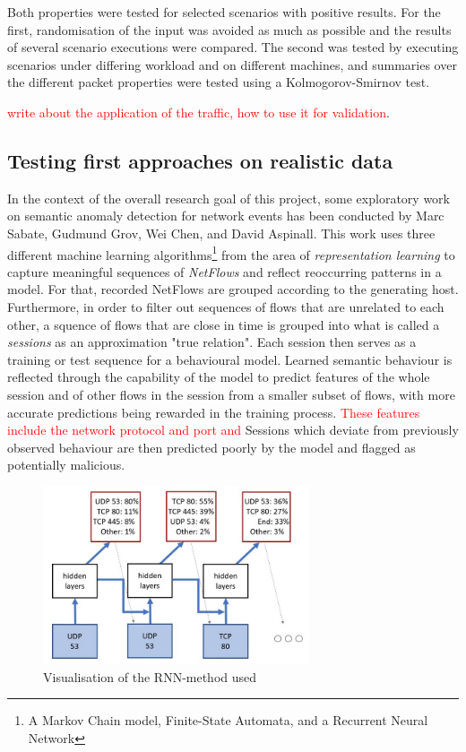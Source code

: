 \documentclass[a4paper,12pt,twoside]{report}
\begin{document}
Both properties were tested for selected scenarios with positive results. For the first, randomisation of the input was avoided as much as possible and the results of several scenario executions were compared. The second was tested by executing scenarios under differing workload and on different machines, and summaries over the different packet properties were tested using a Kolmogorov-Smirnov test. 


\textcolor{red}{write about the application of the traffic, how to use it for validation}.


\subsection{Testing first approaches on realistic data}

In the context of the overall research goal of this project, some exploratory work on semantic anomaly detection for network events has been conducted by Marc Sabate, Gudmund Grov, Wei Chen, and David Aspinall. This work uses three different machine learning algorithms\footnote{A Markov Chain model, Finite-State Automata, and a Recurrent Neural Network} from the area of \textit{representation learning} to capture meaningful sequences of \textit{NetFlows} and reflect reoccurring patterns in a model. For that, recorded NetFlows are grouped according to the generating host. Furthermore, in order to filter out sequences of flows that are unrelated to each other, a squence of flows that are close in time is grouped into what is called a \textit{sessions} as an approximation "true relation". Each session then serves as a training or test sequence for a behavioural model. Learned semantic behaviour is reflected through the capability of the model to predict features of the whole session and of other flows in the session from a smaller subset of flows, with more accurate predictions being rewarded in the training process. \textcolor{red}{These features include the network protocol and port and} Sessions which deviate from previously observed behaviour are then predicted poorly by the model and flagged as potentially malicious.

\begin{figure}\label{RNN}
\centering
\includegraphics[width=0.7\textwidth]{images/RNN.jpg}
\caption{Visualisation of the RNN-method used}
\end{figure}
\end{document}
